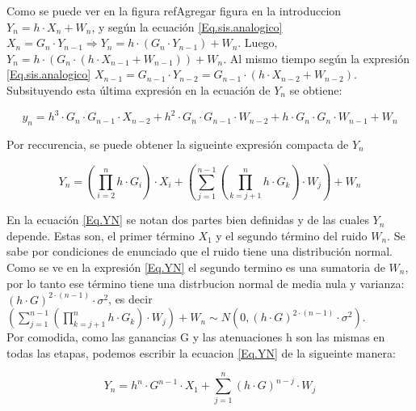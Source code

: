 \indent Como se puede ver en la figura ref{Agregar figura en la introduccion} $Y_n = h \cdot X_n + W_n $, y según la ecuación \ref{Eq.sis.analogico}  $ X_n = G_n \cdot Y_{n-1} \Rightarrow Y_n = h \cdot (G_n \cdot Y_{n-1})+ W_n$. Luego,  $Y_n = h \cdot (G_n \cdot (h \cdot X_{n-1} + W_{n-1})) + W_n $. Al mismo tiempo según la expresión \ref{Eq.sis.analogico} $X_{n-1} = G_{n-1} \cdot Y_{n-2} = G_{n-1} \cdot (h \cdot X_{n-2} + W_{n-2})$. Subsituyendo esta última expresión en la ecuación de $Y_n$ se obtiene:

		\begin{equation}
			y_n = h^3 \cdot G_n \cdot G_{n-1} \cdot X_{n-2} + h^2 \cdot G_n \cdot G_{n-1} \cdot W_{n-2} + h \cdot G_n \cdot G_n \cdot W_{n-1} + W_n
			\label{Eq.yn}			
		\end{equation}

\indent Por reccurencia, se puede obtener la sigueinte expresión compacta de $Y_n$

		\begin{equation}
				Y_n = \left(\prod_{i=2}^{n}{h \cdot G_i} \right) \cdot X_i + \left( \sum_{j=1}^{n-1} \left( \prod_{k=j+1}^{n} h \cdot G_k \right) \cdot W_j \right) + W_n
				\label{Eq.YN}
		\end{equation}
		
\indent En la ecuación \ref{Eq.YN} se notan dos partes bien definidas y de las cuales $Y_n$ depende. Estas son, el primer término $X_1$ y el segundo término del ruido $W_n$. Se sabe por condiciones de enunciado que el ruido tiene una distribución normal. Como se ve en la expresión \ref{Eq.YN} el segundo termino es una sumatoria de $W_n$, por lo tanto ese término tiene una distrbucion normal de media nula y varianza: $\left( h \cdot G \right)^{2 \cdot (n-1)} \cdot \sigma ^2$, es decir $\left( \sum_{j=1}^{n-1} \left( \prod_{k=j+1}^{n} h \cdot G_k \right) \cdot W_j \right) + W_n \sim N (0, \left( h \cdot G \right)^{2 \cdot (n-1)} \cdot \sigma ^2)$.\\

\indent Por comodida, como las ganancias G y las atenuaciones h son las mismas en todas las etapas, podemos escribir la ecuacion \ref{Eq.YN} de la sigueinte manera:

			\begin{equation}
				Y_n = h^n \cdot G^{n-1} \cdot X_1 + \sum_{j=1}^{n} \left( h \cdot G \right)^{n-j} \cdot W_j
				\label{Eq.Yreducida}
			\end{equation}